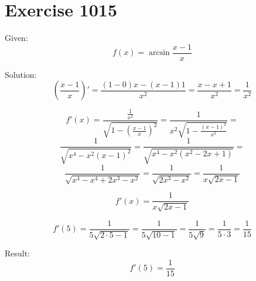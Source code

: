 \documentclass[a4paper, 10pt]{scrartcl}
\begin{document}
\section{Exercise 1015}

Given:
\[
f(x) = \arcsin{\frac{x - 1}{x}}
\]

Solution:
\[
\left(\frac{x - 1}{x}\right)' = \frac{(1 - 0)x - (x - 1)1}{x^{2}} = \frac{x - x + 1}{x^{2}} = \frac{1}{x^{2}}
\]

\[
f'(x) = \frac{\frac{1}{x^{2}}}{\sqrt{1 - \left(\frac{x - 1}{x}\right)^{2}}} =
\frac{1}{x^{2}\sqrt{1 - \frac{(x - 1)^{2}}{x^{2}}}} =
\]
\[
\frac{1}{\sqrt{x^{4} - x^{2}(x - 1)^{2}}} = \frac{1}{\sqrt{x^{4} - x^{2}(x^{2} - 2x + 1)}} =
\]
\[
\frac{1}{\sqrt{x^{4} - x^{4} + 2x^{3} - x^{2}}} = \frac{1}{\sqrt{2x^{3} - x^{2}}} = \frac{1}{x\sqrt{2x - 1}}
\]

\[
f'(x) = \frac{1}{x\sqrt{2x - 1}}
\]

\[
f'(5) = \frac{1}{5\sqrt{2\cdot 5 - 1}} = \frac{1}{5\sqrt{10 - 1}} = \frac{1}{5\sqrt{9}} = \frac{1}{5\cdot 3} = \frac{1}{15}
\]

Result:
\[
f'(5) = \frac{1}{15}
\]
\end{document}
